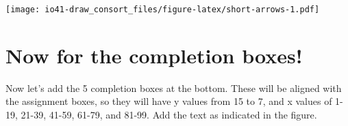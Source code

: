 \documentclass[
]{book}
\newenvironment{Shaded}{\begin{snugshade}}{\end{snugshade}}
\newcommand{\CommentTok}[1]{\textcolor[rgb]{0.56,0.35,0.01}{\textit{#1}}}
\newcommand{\DataTypeTok}[1]{\textcolor[rgb]{0.13,0.29,0.53}{#1}}
\newcommand{\DecValTok}[1]{\textcolor[rgb]{0.00,0.00,0.81}{#1}}
\newcommand{\FloatTok}[1]{\textcolor[rgb]{0.00,0.00,0.81}{#1}}
\newcommand{\KeywordTok}[1]{\textcolor[rgb]{0.13,0.29,0.53}{\textbf{#1}}}
\newcommand{\NormalTok}[1]{#1}
\newcommand{\OperatorTok}[1]{\textcolor[rgb]{0.81,0.36,0.00}{\textbf{#1}}}
\newcommand{\StringTok}[1]{\textcolor[rgb]{0.31,0.60,0.02}{#1}}
\begin{document}
\begin{Shaded}
\end{Shaded}

\texttt{[image: io41-draw\_consort\_files/figure-latex/short-arrows-1.pdf]}

\hypertarget{now-for-the-completion-boxes}{%
\section{Now for the completion boxes!}\label{now-for-the-completion-boxes}}

Now let's add the 5 completion boxes at the bottom. These will be aligned with the assignment boxes, so they will have y values from 15 to 7, and x values of 1-19, 21-39, 41-59, 61-79, and 81-99. Add the text as indicated in the figure.
\end{document}
